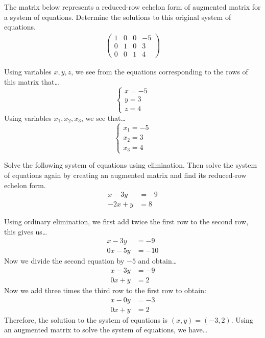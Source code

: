 \documentclass[11pt,letterpaper]{article}
\begin{document}
\newpage



 The matrix below represents a reduced-row echelon form of augmented matrix for a system of equations. Determine the solutions to this original system of equations. 
	\[
	\begin{aligned}
	\begin{pmatrix}
	1 & 0 & 0 & -5 \\
	0 & 1 & 0 & 3 \\
	0 & 0 & 1 & 4
	\end{pmatrix}
	\end{aligned}
	\] \pspace

\sol Using variables $x, y, z$, we see from the equations corresponding to the rows of this matrix that\dots \pspace
	\[
	\begin{cases}
	x= -5 \\
	y= 3 \\
	z= 4
	\end{cases}
	\] \pspace
Using variables $x_1, x_2, x_3$, we see that\dots \pspace
	\[
	\begin{cases}
	x_1= -5 \\
	x_2= 3 \\
	x_3= 4
	\end{cases}
	\]



\newpage



 Solve the following system of equations using elimination. Then solve the system of equations again by creating an augmented matrix and find its reduced-row echelon form.
	\[
	\begin{aligned}
	x - 3y&= -9 \\
	-2x + y&= 8
	\end{aligned}
	\] \pspace

\sol Using ordinary elimination, we first add twice the first row to the second row, this gives us\dots
	\[
	\begin{aligned}
	x - 3y&= -9 \\
	0x - 5y&= -10
	\end{aligned}
	\]
Now we divide the second equation by $-5$ and obtain\dots
	\[
	\begin{aligned}
	x - 3y&= -9 \\
	0x + y&= 2
	\end{aligned}
	\]
Now we add three times the third row to the first row to obtain:
	\[
	\begin{aligned}
	x - 0y&= -3 \\
	0x + y&= 2
	\end{aligned}
	\]
Therefore, the solution to the system of equations is $(x, y)= (-3, 2)$. Using an augmented matrix to solve the system of equations, we have\dots
\end{document}
